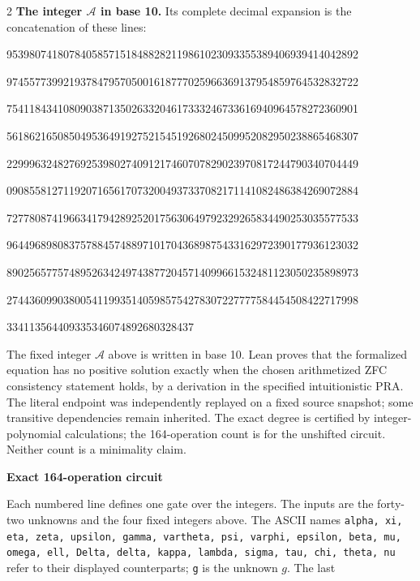 \documentclass[10pt]{article}
\begin{document}
\begin{multicols}{2}
\textbf{The integer $\mathcal A$ in base 10.}
Its complete decimal expansion is the concatenation of these lines:\par
\begingroup\fontsize{7.7}{8.2}\selectfont{}\par
95398074180784058571518488282119861023093355389406939414042892\par
97455773992193784795705001618777025966369137954859764532832722\par
75411843410809038713502633204617333246733616940964578272360901\par
56186216508504953649192752154519268024509952082950238865468307\par
22999632482769253980274091217460707829023970817244790340704449\par
09085581271192071656170732004937337082171141082486384269072884\par
72778087419663417942892520175630649792329265834490253035577533\par
96449689808375788457488971017043689875433162972390177936123032\par
89025657757489526342497438772045714099661532481123050235898973\par
27443609903800541199351405985754278307227777584454508422717998\par
334113564409335346074892680328437\par
\endgroup
\normalfont\fontsize{7.7}{8.2}\selectfont
The fixed integer $\mathcal A$ above is written in base 10. Lean proves that the formalized equation has no positive solution exactly
when the chosen arithmetized ZFC consistency statement holds, by a derivation
in the specified intuitionistic PRA. The literal endpoint was independently
replayed on a fixed source snapshot; some transitive dependencies remain
inherited. The exact degree is certified by integer-polynomial calculations;
the 164-operation count is for the unshifted circuit. Neither count is a
minimality claim.
\end{multicols}
\clearpage
\begin{center}{\large\bfseries Exact 164-operation circuit}\end{center}
Each numbered line defines one gate over the integers. The inputs are the
forty-two unknowns and the four fixed integers above. The ASCII names
\texttt{alpha, xi, eta, zeta, upsilon, gamma, vartheta, psi, varphi, epsilon, beta, mu, omega, ell, Delta, delta, kappa, lambda, sigma, tau, chi, theta, nu}
refer to their displayed counterparts; \texttt{g} is the unknown $g$. The last
\end{document}
